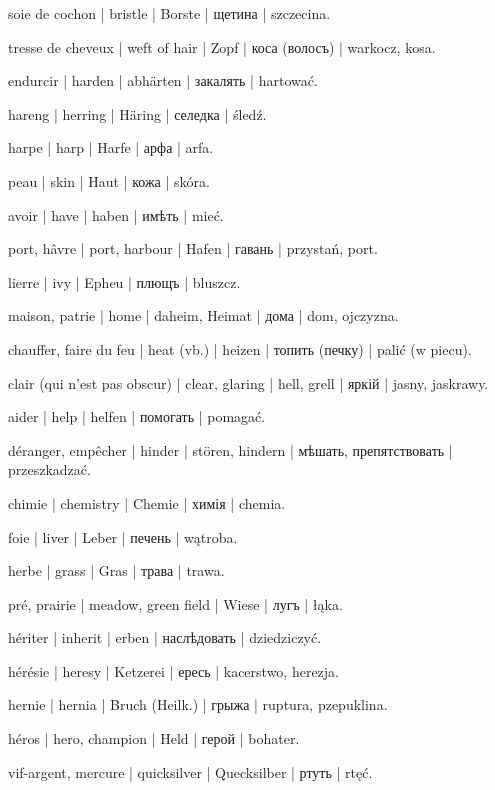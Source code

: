 \begin{outdent}{1em}
\uvsubentry{}
soie de cochon | bristle | Borste | щетина | szczecina.


\uvsubentry{}
tresse de cheveux | weft of hair | Zopf | коса (волосъ) | warkocz, kosa.

endurcir | harden | abhärten | закалять | hartować.

hareng | herring | Häring | селедка | śledź.

harpe | harp | Harfe | арфа | arfa.

peau | skin | Haut | кожа | skóra.

avoir | have | haben | имѣть | mieć.

port, hâvre | port, harbour | Hafen | гавань | przystań,
port.

lierre | ivy | Epheu | плющъ | bluszcz.

maison, patrie | home | daheim, Heimat | дома | dom, ojczyzna.

chauffer, faire du feu | heat (vb.) | heizen | топить (печку) | palić (w piecu).

clair (qui n’est pas obscur) | clear, glaring | hell, grell | яркій | jasny, jaskrawy.

aider | help | helfen | помогать | pomagać.

\uvsubentry{}
déranger, empêcher | hinder | stören, hindern | мѣшать, препятствовать | przeszkadzać.

chimie | chemistry | Chemie | химія | chemia.

foie | liver | Leber | печень | wątroba.

herbe | grass | Gras | трава | trawa.

pré, prairie | meadow, green field | Wiese | лугъ | łąka.

hériter | inherit | erben | наслѣдовать | dziedziczyć.

hérésie | heresy | Ketzerei | ересь | kacerstwo, herezja.

hernie | hernia | Bruch (Heilk.) | грыжа | ruptura, pzepuklina.

héros | hero, champion | Held | герой | bohater.

vif-argent, mercure | quicksilver | Quecksilber | ртуть | rtęć.


\end{outdent}
